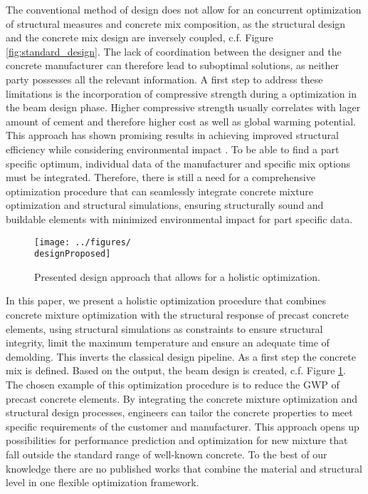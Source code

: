 The conventional method of design does not allow for an concurrent optimization of structural measures and concrete mix composition, as the structural  design and the concrete mix design are inversely coupled, c.f. Figure \ref{fig:standard_design}.
The lack of coordination between the designer and the concrete manufacturer can therefore lead to suboptimal solutions, as neither party possesses all the relevant information.
A first step to address these limitations is the incorporation of compressive strength during a optimization in the beam design phase.
Higher compressive strength usually correlates with lager amount of cement and therefore higher cost as well as global warming potential.
This approach has shown promising results in achieving improved structural efficiency while considering environmental impact \cite{dos_Santos_2023}.
To be able to find a part specific optimum, individual data of the manufacturer and specific mix options must be integrated.
Therefore, there is still a need for a comprehensive optimization procedure that can seamlessly integrate concrete mixture optimization and structural simulations, ensuring structurally sound and buildable elements with minimized environmental impact for part specific data.
\\
\begin{figure}[b]%
	\centering
	\texttt{[image: ../figures/\\designProposed]}
	\caption{Presented design approach that allows for a holistic optimization.}\label{fig:proposed_workflow}
\end{figure}
In this paper, we present a holistic optimization procedure that combines concrete mixture optimization with the structural response of precast concrete elements, using structural simulations as constraints to ensure structural integrity, limit the maximum temperature and ensure an adequate time of demolding.
This inverts the classical design pipeline.
As a first step the concrete mix is defined.
Based on the output, the beam design is created, c.f. Figure \ref{fig:proposed_workflow}.
The chosen example of this optimization procedure is to reduce the GWP of precast concrete elements. 
By integrating the concrete mixture optimization and structural design processes, engineers can tailor the concrete properties to meet specific requirements of the customer and manufacturer.
This approach opens up possibilities for performance prediction and optimization for new mixture that fall outside the standard range of well-known concrete.
To the best of our knowledge there are no published works that combine the material and structural level in one flexible optimization framework.
